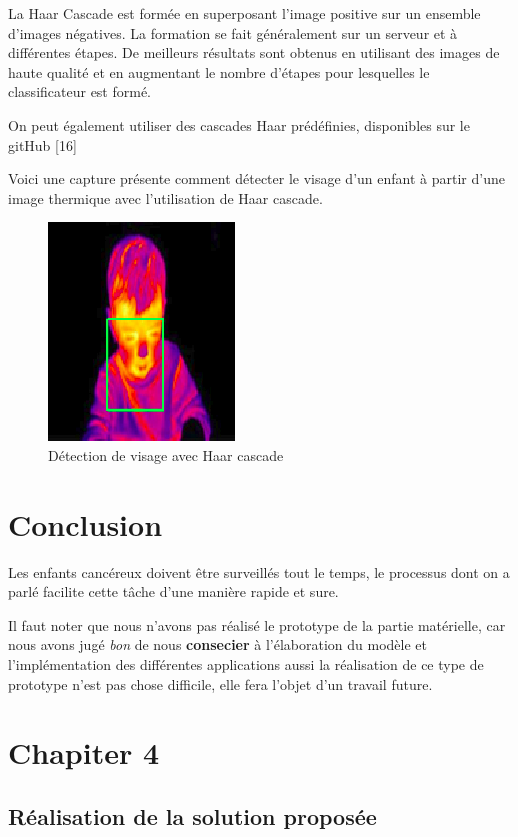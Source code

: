 \documentclass[12pt]{article}
\begin{document}
La Haar Cascade est formée en superposant l'image positive sur un ensemble d'images négatives. La formation se fait généralement sur un serveur et à différentes étapes. De meilleurs résultats sont obtenus en utilisant des images de haute qualité et en augmentant le nombre d'étapes pour lesquelles le classificateur est formé.

On peut également utiliser des cascades Haar prédéfinies, disponibles sur le gitHub [16]

Voici une capture présente comment détecter le visage d'un enfant à partir d'une image thermique avec l'utilisation de Haar cascade.

\begin{figure}[h]
	\centering
	\includegraphics[scale=1]{img-Chapiter-3/enfant.png}
	\caption{Détection de visage avec Haar cascade}
\end{figure}
\section{Conclusion}
Les enfants cancéreux doivent être surveillés tout le temps, le processus dont on a parlé facilite cette tâche d’une manière rapide et sure. 

Il faut noter que nous n'avons pas réalisé le prototype de la partie matérielle, car nous avons jugé \textit{bon} de nous \textbf{consecier} à l'élaboration du modèle et l'implémentation des différentes applications aussi la réalisation de ce type de prototype n'est pas chose difficile, elle fera l'objet d'un travail future.

\newpage
\rhead{}
\section*{\Huge{Chapiter 4}}
\subsection*{\huge{Réalisation de la solution proposée}}
\newpage
{}
\end{document}
